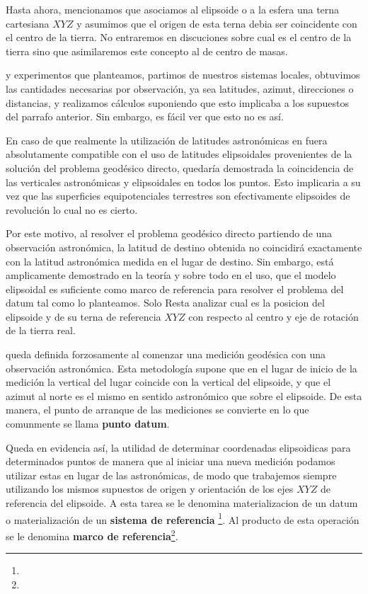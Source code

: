 \documentclass{tufte-book}
\begin{document}
Hasta ahora, mencionamos que asociamos al elipsoide o a la esfera una terna cartesiana \(XYZ\)
y asumimos que el origen de esta terna debia ser coincidente con el centro de la tierra.
No entraremos en discuciones sobre cual es el centro de la tierra sino que asimilaremos este
concepto al de centro de masas.

 y experimentos que planteamos, partimos de nuestros
sistemas locales, obtuvimos las cantidades necesarias por observación, ya sea latitudes,
azimut, direcciones o distancias, y realizamos cálculos suponiendo que esto implicaba a los
supuestos del parrafo anterior. Sin embargo, es fácil ver que esto no es así.

En caso de que realmente la utilización de latitudes astronómicas en fuera absolutamente
compatible con el uso de latitudes elipsoidales provenientes de la solución del problema
geodésico directo, quedaría demostrada la coincidencia de las verticales astronómicas y
elipsoidales en todos los puntos. Esto implicaria a su vez que las superficies equipotenciales
terrestres son efectivamente elipsoides de revolución lo cual no es cierto.

Por este motivo, al resolver el problema geodésico directo partiendo de una observación
astronómica, la latitud de destino obtenida no coincidirá exactamente con la latitud astronómica
medida en el lugar de destino. Sin embargo, está amplicamente demostrado en la teoría y
sobre todo en el uso, que el modelo elipsoidal es suficiente como marco de referencia para
resolver el problema del datum tal como lo planteamos. Solo Resta analizar cual es la posicion
del elipsoide y de su terna de referencia \(XYZ\) con respecto al centro y eje de rotación de la
tierra real.

 queda definida forzosamente al
comenzar una medición geodésica con una observación astronómica. Esta metodología supone que en
el lugar de inicio de la medición la vertical del lugar coincide con la vertical del elipsoide, y
que el azimut al norte es el mismo en sentido astronómico que sobre el elipsoide. De esta manera,
el punto de arranque de las mediciones se convierte en lo que comunmente se llama \textbf{punto datum}.

Queda en evidencia así, la utilidad de determinar coordenadas elipsoidicas para determinados puntos
de manera que al iniciar una nueva medición podamos utilizar estas en lugar de las astronómicas,
de modo que trabajemos siempre utilizando los mismos supuestos de origen y orientación de los ejes
\(XYZ\) de referencia del elipsoide. A esta tarea se le denomina materializacion de un datum o
materialización de un \textbf{sistema de referencia} \footnote{}. Al producto de esta operación se le denomina
\textbf{marco de referencia}\footnote{}.
\end{document}
